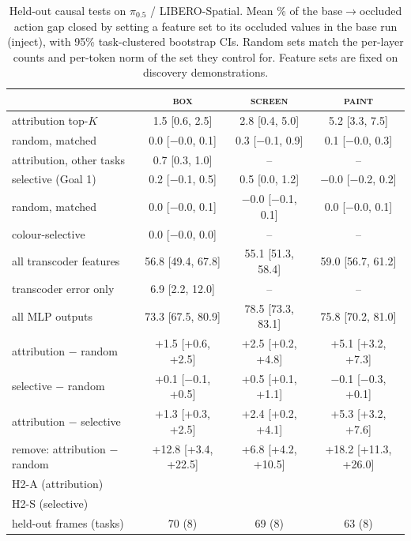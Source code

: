 \documentclass{article}
\newcommand{\xmark}{\ding{55}}
\begin{document}
\begin{table}[t]
\centering\small
\caption{Held-out causal tests on $\pi_{0.5}$ / LIBERO-Spatial. Mean \% of the base$\rightarrow$occluded action gap closed by setting a feature set to its occluded values in the base run (inject), with 95\% task-clustered bootstrap CIs. Random sets match the per-layer counts and per-token norm of the set they control for. Feature sets are fixed on discovery demonstrations.}
\label{tab:main}
\begin{tabular}{lccc}
\toprule
 & \textsc{box} & \textsc{screen} & \textsc{paint} \\
\midrule
attribution top-$K$ & 1.5 [0.6, 2.5] & 2.8 [0.4, 5.0] & 5.2 [3.3, 7.5] \\
\quad random, matched & 0.0 [$-$0.0, 0.1] & 0.3 [$-$0.1, 0.9] & 0.1 [$-$0.0, 0.3] \\
attribution, other tasks & 0.7 [0.3, 1.0] & -- & -- \\
selective (Goal 1) & 0.2 [$-$0.1, 0.5] & 0.5 [0.0, 1.2] & $-$0.0 [$-$0.2, 0.2] \\
\quad random, matched & 0.0 [$-$0.0, 0.1] & $-$0.0 [$-$0.1, 0.1] & 0.0 [$-$0.0, 0.1] \\
colour-selective & 0.0 [$-$0.0, 0.0] & -- & -- \\
all transcoder features & 56.8 [49.4, 67.8] & 55.1 [51.3, 58.4] & 59.0 [56.7, 61.2] \\
transcoder error only & 6.9 [2.2, 12.0] & -- & -- \\
all MLP outputs & 73.3 [67.5, 80.9] & 78.5 [73.3, 83.1] & 75.8 [70.2, 81.0] \\
\midrule
attribution $-$ random & +1.5 [+0.6, +2.5] & +2.5 [+0.2, +4.8] & +5.1 [+3.2, +7.3] \\
selective $-$ random & +0.1 [$-$0.1, +0.5] & +0.5 [+0.1, +1.1] & $-$0.1 [$-$0.3, +0.1] \\
attribution $-$ selective & +1.3 [+0.3, +2.5] & +2.4 [+0.2, +4.1] & +5.3 [+3.2, +7.6] \\
remove: attribution $-$ random & +12.8 [+3.4, +22.5] & +6.8 [+4.2, +10.5] & +18.2 [+11.3, +26.0] \\
\midrule
H2-A (attribution) & \xmark & \xmark & \xmark \\
H2-S (selective) & \xmark & \xmark & \xmark \\
held-out frames (tasks) & 70 (8) & 69 (8) & 63 (8) \\
\bottomrule
\end{tabular}
\end{table}
\end{document}
